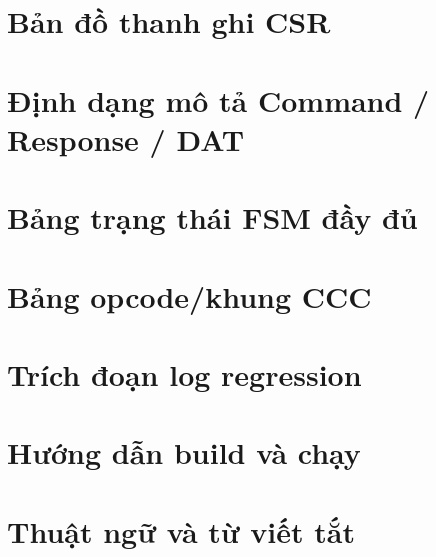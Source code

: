 
\chapter{Bản đồ thanh ghi CSR}
\label{app:csr}

\chapter{Định dạng mô tả Command / Response / DAT}
\label{app:descriptors}

\chapter{Bảng trạng thái FSM đầy đủ}
\label{app:fsm-tables}

\chapter{Bảng opcode/khung CCC}
\label{app:ccc}

\chapter{Trích đoạn log regression}
\label{app:logs}

\chapter{Hướng dẫn build và chạy}
\label{app:build}

\chapter{Thuật ngữ và từ viết tắt}
\label{app:glossary}

